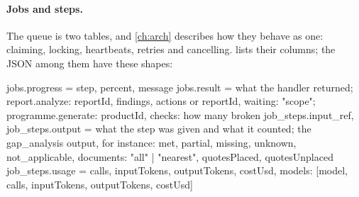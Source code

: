 \paragraph{Jobs and steps.} The queue is two tables, and \cref{ch:arch} describes how they
behave as one: claiming, locking, heartbeats, retries and cancelling.  lists
their columns; the JSON among them have these shapes:

\begin{codeblock}
jobs.progress   = {step, percent, message}
jobs.result     = what the handler returned; report.analyze:
                  {reportId, findings, actions} or {reportId, waiting: "scope"};
                  programme.generate: {productId, checks: how many broken}
job_steps.input_ref, job_steps.output
                = what the step was given and what it counted; the
                  gap_analysis output, for instance: {met, partial, missing,
                  unknown, not_applicable, documents: "all" | "nearest",
                  quotesPlaced, quotesUnplaced}
job_steps.usage = {calls, inputTokens, outputTokens, costUsd,
                   models: [{model, calls, inputTokens, outputTokens, costUsd}]}
\end{codeblock}

